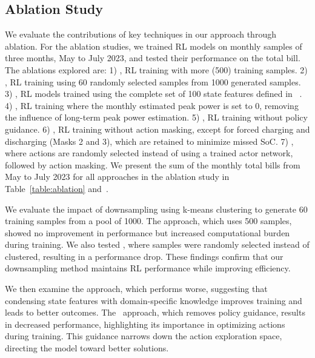 %  


\subsection{Ablation Study}
\label{ssec:ablation}

We evaluate the contributions of key techniques in our approach through ablation. For the ablation studies, we trained RL models on monthly samples of three months, May to July 2023, and tested their performance on the total bill. The ablations explored are: 
1) \rlcluster, RL training with more (500) training samples. 
2) \rlrandom, RL training using 60 randomly selected samples from 1000 generated samples.
3) \rlmorefeature, RL models trained using the complete set of 100 state features defined in ~. 
4) \rlnoe, RL training where the monthly estimated peak power is set to 0, removing the influence of long-term peak power estimation. 
5) \rlnop, RL training without policy guidance. 
6) \rlnoa, RL training without action masking, except for forced charging and discharging (Masks 2 and 3), which are retained to minimize missed SoC. 
7) \random, where actions are randomly selected instead of using a trained actor network, followed by action masking.
We present the sum of the monthly total bills from May to July 2023 for all approaches in the ablation study in Table~\ref{table:ablation} and~. 
 
We evaluate the impact of downsampling using k-means clustering to generate 60 training samples from a pool of 1000. The \rlcluster approach, which uses 500 samples, showed no improvement in performance but increased computational burden during training. We also tested \rlrandom, where samples were randomly selected instead of clustered, resulting in a performance drop. These findings confirm that our downsampling method maintains RL performance while improving efficiency.

We then examine the \rlmorefeature approach, which performs worse, suggesting that condensing state features with domain-specific knowledge improves training and leads to better outcomes. 
The \rlnop\  approach, which removes policy guidance, results in decreased performance, highlighting its importance in optimizing actions during training. This guidance narrows down the action exploration space, directing the model toward better solutions.
 
